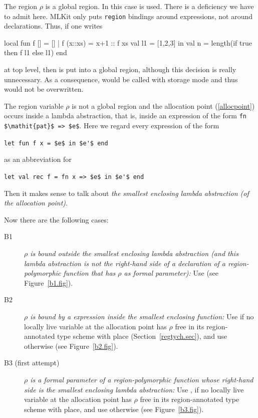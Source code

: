 \documentclass[12pt]{book}
\begin{document}
 The region $\rho$ is a global region.
In this case  is used.
There is a deficiency we have to admit here. MLKit only puts
\lstinline{region} bindings around expressions, not around declarations. Thus,
if one writes
\begin{smlcode}
  local
    fun f [] = []
      | f (x::xs) = x+1 :: f xs
    val l1 = [1,2,3]
  in
    val n = length(if true then f l1 else l1)
  end
\end{smlcode}

\noindent
at top level, then  is put into a global region, although this decision
is really unnecessary. As a consequence,  would be called with storage
mode  and thus  would not be overwritten.  \bigskip

The region variable $\rho$ is not a global region and the allocation
point (\ref{allocpoint}) occurs inside a lambda abstraction, that is,
inside an expression of the form \lstinline!fn $\mathit{pat}$ => $e$!.  Here we
regard every expression of the form
\begin{center}
  \lstinline!let fun f x = $e$ in $e'$ end!
\end{center}
as an abbreviation for
\begin{center}
  \lstinline!let val rec f = fn x => $e$ in $e'$ end!
\end{center}
Then it makes sense to talk about {\em the smallest enclosing lambda abstraction
  (of the allocation point)}.

Now there are the following cases:
\begin{description}
\item[B1] {\it $\rho$ is bound outside the smallest enclosing lambda abstraction
  (and this lambda abstraction is not the right-hand side of a declaration of a
  region-polymorphic function that has $\rho$ as formal parameter):} Use
  (see Figure~\ref{b1.fig}).
\item[B2] {\it $\rho$ is bound by a {\rm {}} expression inside the
  smallest enclosing function:} Use  if no locally live variable at
  the allocation point has $\rho$ free in its region-annotated type scheme with
  place (Section~\ref{regtych.sec}), and use  otherwise
  (see Figure~\ref{b2.fig}).
\item[B3 (first attempt)]{\it $\rho$ is a formal parameter of a
  region-polymorphic function whose right-hand side is the smallest enclosing
  lambda abstraction:} Use
  , if no locally live variable at the allocation point has $\rho$ free
  in its region-annotated type scheme with place, and use  otherwise
  (see Figure~\ref{b3.fig}).
\end{description}
\end{document}
